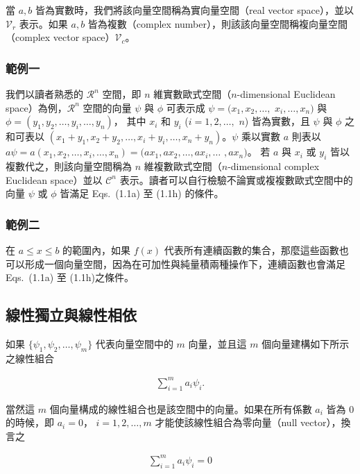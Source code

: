 當 $a,b$ 皆為實數時，我們將該向量空間稱為實向量空間（real vector space），並以 $ \mathcal{V}_r $ 表示。如果 $a,b$ 皆為複數（complex number），則該該向量空間稱複向量空間（complex vector space）$ \mathcal{V}_c $。

\subsubsection*{範例一}
我們以讀者熟悉的 $ \mathcal{R}^n $ 空間，即 $ n $ 維實數歐式空間（$ n $-dimensional Euclidean space）為例，$ \mathcal{R}^n $ 空間的向量 $ \psi $ 與 $ \phi $ 可表示成 $ \psi =(x_1, x_2,\ldots,$ $x_i, \ldots, x_n) $ 與 $ \phi =(y_1,y_2,\ldots,y_i,\ldots,y_n) $， 其中 $ x_i $ 和 $ y_i $ ($ i=1,2,\ldots,$ $ n $) 皆為實數，且 $ \psi $ 與 $ \phi $ 之和可表以 $ (x_1+y_1,x_2+y_2,\ldots,x_i+y_i,\ldots,x_n+y_n) $。$\psi$ 乘以實數 $a$ 則表以 $ a\psi =a(x_1,x_2,\ldots,x_i,\ldots,x_n)= (ax_1,ax_2,\ldots,ax_i,\ldots$ $ ,ax_n) $。 若 $ a $ 與 $ x_i $ 或 $ y_i $ 皆以複數代之，則該向量空間稱為 $n$ 維複數歐式空間（$ n $-dimensional complex Euclidean space）並以 $ \mathcal{C}^n$ 表示。讀者可以自行檢驗不論實或複複數歐式空間中的向量 $\psi$ 或 $ \phi $ 皆滿足 Eqs.~(1.1a) 至 (1.1h) 的條件。

\subsubsection*{範例二}

在 $ a\leqslant x\leqslant b$ 的範圍內，如果 $ f(x) $ 代表所有連續函數的集合，那麼這些函數也可以形成一個向量空間，因為在可加性與純量積兩種操作下，連續函數也會滿足 Eqs.~(1.1a) 至 (1.1h)之條件。

\subsection{線性獨立與線性相依}
如果 $ \{\psi_1,\psi_2,\ldots, \psi_m\} $ 代表向量空間中的 $ m $ 向量，並且這 $ m $ 個向量建構如下所示之線性組合

\begin{align}
\sum_{i=1}^m a_i\psi_i.
\end{align}

\noindent 當然這 $ m $ 個向量構成的線性組合也是該空間中的向量。如果在所有係數 $ a_i $ 皆為 0 的時候，即 $ a_i =0$， $ i=1,2,\ldots, m $ 才能使該線性組合為零向量（null vector），換言之  

\begin{align}
\sum_{i=1}^m a_i\psi_i=0
\end{align}

